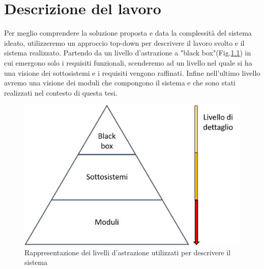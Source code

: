 \chapter{Descrizione del lavoro}
\label{scenario}
Per meglio comprendere la soluzione proposta e data la complessità del sistema ideato, utilizzeremo un approccio top-down per descrivere il lavoro svolto e il sistema realizzato. Partendo da un livello d'astrazione a "black box"(Fig.\ref{fig:livelliAstrazione}) in cui emergono solo i requisiti funzionali, scenderemo ad un livello nel quale si ha una visione dei sottosistemi e i requisiti vengono raffinati. Infine nell'ultimo livello avremo una visione dei moduli che compongono il sistema e che sono stati realizzati nel contesto di questa tesi.
\begin{figure}[H]
	\centering
	\includegraphics[scale=0.4]{DescrizioneDelSistema/livelli_astrazione.png}
	\caption{Rappresentazione dei livelli d'astrazione utilizzati per descrivere il sistema }
	\label{fig:livelliAstrazione}
\end{figure}
\newpage

